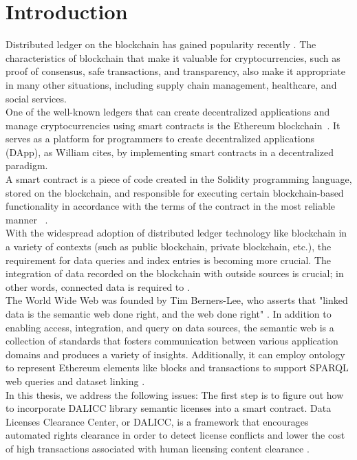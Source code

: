 \section{Introduction}
Distributed ledger on the blockchain has gained popularity recently \cite{Third}. The characteristics of blockchain that make it valuable for cryptocurrencies, such as proof of consensus, safe transactions, and transparency, also make it appropriate in many other situations, including supply chain management, healthcare, and social services. \\
One of the well-known ledgers that can create decentralized applications and manage cryptocurrencies using smart contracts is the Ethereum blockchain \cite{Third}. It serves as a platform for programmers to create decentralized applications (DApp), as William cites, by implementing smart contracts in a decentralized paradigm. \\
A smart contract is a piece of code created in the Solidity programming language, stored on the blockchain, and responsible for executing certain blockchain-based functionality in accordance with the terms of the contract in the most reliable manner  \cite{Third}. \\
With the widespread adoption of distributed ledger technology like blockchain in a variety of contexts (such as public blockchain, private blockchain, etc.), the requirement for data queries and index entries is becoming more crucial. The integration of data recorded on the blockchain with outside sources is crucial; in other words, connected data is required to \cite{third}. \\
The World Wide Web was founded by Tim Berners-Lee, who asserts that "linked data is the semantic web done right, and the web done right" \cite{Hector}. 
In addition to enabling access, integration, and query on data sources, the semantic web is a collection of standards that fosters communication between various application domains and produces a variety of insights. Additionally, it can employ ontology to represent Ethereum elements like blocks and transactions to support SPARQL web queries and dataset linking \cite{Third}. \\
In this thesis, we address the following issues: The first step is to figure out how to incorporate DALICC library semantic licenses into a smart contract. 
Data Licenses Clearance Center, or DALICC, is a framework that encourages automated rights clearance in order to detect license conflicts and lower the cost of high transactions associated with human licensing content clearance \cite{Anna}.\\
